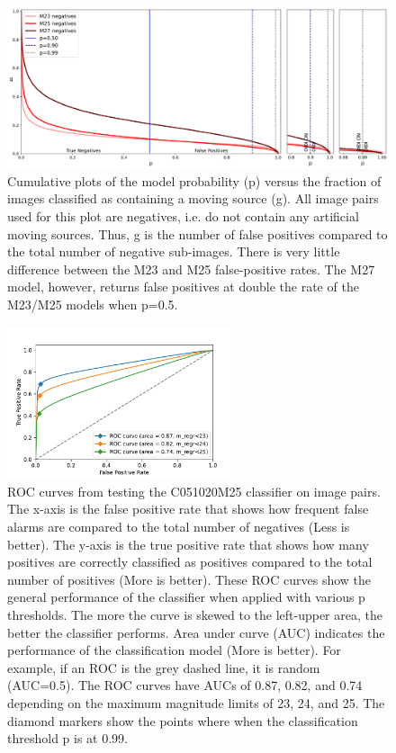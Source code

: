 \documentclass{aastex631}
\begin{document}
\begin{figure}[ht]
    \centering
    \includegraphics[width=\textwidth,keepaspectratio]{Figures/completeness_negatives.png}
    \caption{Cumulative plots of the model probability (p) versus the fraction of images classified as containing a moving source (g).  
    All image pairs used for this plot are negatives, i.e. do not contain any artificial moving sources.
    Thus, g is the number of false positives compared to the total number of negative sub-images.
    There is very little difference between the M23 and M25 false-positive rates.
    The M27 model, however, returns false positives at double the rate of the M23/M25 models when p=0.5.}
    \label{fig:negatives}
\end{figure}
\setlength{\tabcolsep}{6pt}

\begin{figure}[ht]
    \centering
    \includegraphics[width=0.6\textwidth,keepaspectratio]{Figures/ROC.pdf}
    \caption{ROC curves from testing the C051020M25 classifier on image pairs.
    The x-axis is the false positive rate that shows how frequent false alarms are compared to the total number of negatives (Less is better).
    The y-axis is the true positive rate that shows how many positives are correctly classified as positives compared to the total number of positives (More is better).
    These ROC curves show the general performance of the classifier when applied with various p thresholds.
    The more the curve is skewed to the left-upper area, the better the classifier performs.
    Area under curve (AUC) indicates the performance of the classification model (More is better).
    For example, if an ROC is the grey dashed line, it is random (AUC=0.5).
    The ROC curves have AUCs of 0.87, 0.82, and 0.74 depending on the maximum magnitude limits of 23, 24, and 25.
    The diamond markers show the points where when the classification threshold p is at 0.99.
    }
    \label{fig:ROC}
\end{figure}
\end{document}
